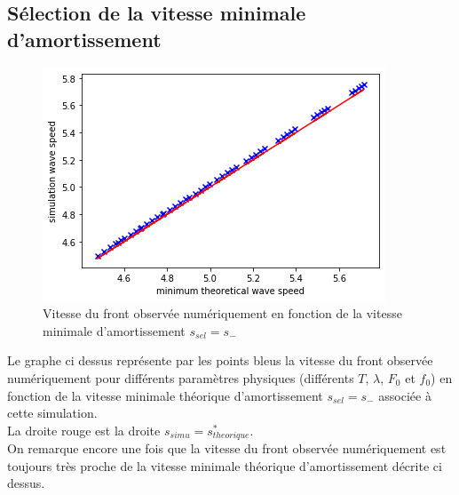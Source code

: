 \documentclass[11pt]{article}
\begin{document}
\subsection{Sélection de la vitesse minimale d'amortissement}
\begin{figure}[h!]
\centering
\includegraphics[width=.9\textwidth]{Images/s_sel_fluide.png}
\caption{Vitesse du front observée numériquement en fonction de la vitesse minimale d'amortissement $s_{sel}=s_-$}
\end{figure}


Le graphe ci dessus représente par les points bleus la vitesse du front observée numériquement pour différents paramètres physiques (différents $T$, $\lambda$, $F_0$ et $f_0$) en fonction de la vitesse minimale théorique d'amortissement $s_{sel}=s_-$ associée à cette simulation. \\
La droite rouge est la droite $s_{simu} = s^*_{theorique}$.\\
On remarque encore une fois que la vitesse du front observée numériquement est toujours très proche de la vitesse minimale théorique d'amortissement décrite ci dessus.
\newpage
\end{document}
